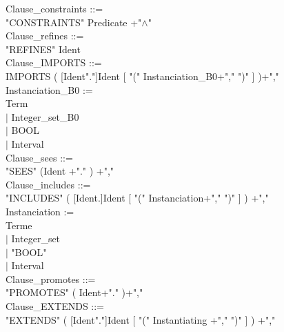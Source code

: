 \documentclass[12pt,a4paper,draft]{article}
\begin{document}
\footnotesize{
\begin{sloppypar}

\noindent Clause\_constraints ::= \\
\hspace*{0.20in}  "CONSTRAINTS" Predicate +"$\land$"\\
Clause\_refines ::=\\ 
\hspace*{0.20in}  "REFINES" Ident \\
Clause\_IMPORTS ::= \\
\hspace*{0.20in} IMPORTS ( [Ident"."]Ident  [ "(" Instanciation\_B0+"," ")" ] )+","\\
Instanciation\_B0 := \\
\hspace*{0.20in}    Term\\
\hspace*{0.20in} $|$  Integer\_set\_B0\\
\hspace*{0.20in} $|$  BOOL\\
\hspace*{0.20in} $|$  Interval\\
Clause\_sees ::= \\
\hspace*{0.20in}  "SEES" (Ident +"." ) +","\\
Clause\_includes ::= \\
\hspace*{0.20in}  "INCLUDES" ( [Ident.]Ident  [ "(" Instanciation+","  ")" ] ) +","\\
Instanciation := \\
\hspace*{0.20in}    Terme\\
\hspace*{0.20in} $|$  Integer\_set\\
\hspace*{0.20in} $|$ "BOOL"\\
\hspace*{0.20in} $|$  Interval \\
Clause\_promotes ::= \\
\hspace*{0.20in}   "PROMOTES" ( Ident+"." )+","\\
\noindent Clause\_EXTENDS ::= \\
\hspace*{0.20in}  "EXTENDS" ( [Ident"."]Ident  [ "(" Instantiating +","  ")" ] ) +","\\

\end{sloppypar}}
\end{document}
